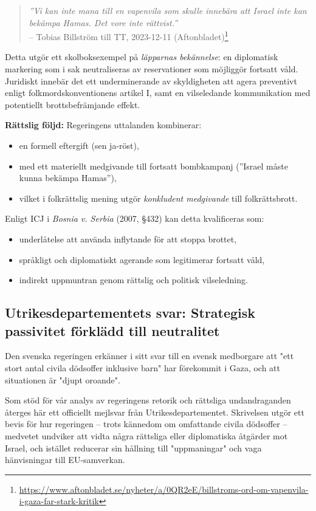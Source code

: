 \begin{quote}
\textit{”Vi kan inte mana till en vapenvila som skulle innebära att Israel inte kan bekämpa Hamas. Det vore inte rättvist.”} \\
– Tobias Billström till TT, 2023-12-11 (Aftonbladet)\footnote{\url{https://www.aftonbladet.se/nyheter/a/0QR2eE/billstroms-ord-om-vapenvila-i-gaza-far-stark-kritik}}
\end{quote}

Detta utgör ett skolboksexempel på \textit{läpparnas bekännelse}: en diplomatisk markering som i sak neutraliseras av reservationer som möjliggör fortsatt våld. Juridiskt innebär det ett underminerande av skyldigheten att agera preventivt enligt folkmordskonventionens artikel I, samt en vilseledande kommunikation med potentiellt brottsbefrämjande effekt.

\textbf{Rättslig följd:} Regeringens uttalanden kombinerar:
\begin{itemize}
  \item en formell eftergift (sen ja-röst),
  \item med ett materiellt medgivande till fortsatt bombkampanj (”Israel måste kunna bekämpa Hamas”),
  \item vilket i folkrättslig mening utgör \textit{konkludent medgivande} till folkrättsbrott.
\end{itemize}

Enligt ICJ i \textit{Bosnia v. Serbia} (2007, §432) kan detta kvalificeras som:
\begin{itemize}
  \item underlåtelse att använda inflytande för att stoppa brottet,
  \item språkligt och diplomatiskt agerande som legitimerar fortsatt våld,
  \item indirekt uppmuntran genom rättslig och politisk vilseledning.
\end{itemize}


\subsection*{Utrikesdepartementets svar: Strategisk passivitet förklädd till neutralitet}

Den svenska regeringen erkänner i sitt svar till en svensk medborgare att "ett stort antal civila dödsoffer inklusive barn" har förekommit i Gaza, och att situationen är "djupt oroande".

Som stöd för vår analys av regeringens retorik och rättsliga undandraganden återges här ett officiellt mejlsvar från Utrikesdepartementet. Skrivelsen utgör ett bevis för hur regeringen – trots kännedom om omfattande civila dödsoffer – medvetet undviker att vidta några rättsliga eller diplomatiska åtgärder mot Israel, och istället reducerar sin hållning till "uppmaningar" och vaga hänvisningar till EU-samverkan.

